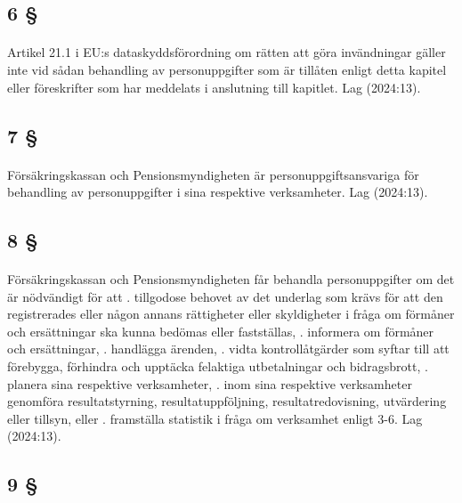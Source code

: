 \documentclass[a4paper,notitlepage,openany,10pt]{book}
\begin{document}
\subsection*{6 §}
\paragraph*{}
Artikel 21.1 i EU:s dataskyddsförordning om rätten att göra invändningar gäller inte vid sådan behandling av personuppgifter som är tillåten enligt detta kapitel eller föreskrifter som har meddelats i anslutning till kapitlet.
Lag (2024:13).
\subsection*{7 §}
\paragraph*{}
Försäkringskassan och Pensionsmyndigheten är personuppgiftsansvariga för behandling av personuppgifter i sina respektive verksamheter.
Lag (2024:13).
\subsection*{8 §}
\paragraph*{}
Försäkringskassan och Pensionsmyndigheten får behandla personuppgifter om det är nödvändigt för att
. tillgodose behovet av det underlag som krävs för att den registrerades eller någon annans rättigheter eller skyldigheter i fråga om förmåner och ersättningar ska kunna bedömas eller fastställas,
. informera om förmåner och ersättningar,
. handlägga ärenden,
. vidta kontrollåtgärder som syftar till att förebygga, förhindra och upptäcka felaktiga utbetalningar och bidragsbrott,
. planera sina respektive verksamheter,
. inom sina respektive verksamheter genomföra resultatstyrning, resultatuppföljning, resultatredovisning, utvärdering eller tillsyn, eller
. framställa statistik i fråga om verksamhet enligt 3-6.
Lag (2024:13).
\subsection*{9 §}
\end{document}
